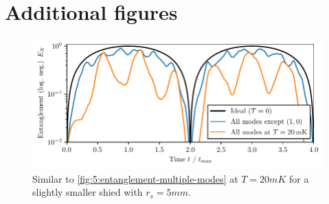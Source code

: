\chapter{Additional figures}\label{apx:additiona-figures}
\begin{figure}[!htbp]
  \centering
  \includegraphics[width=\textwidth]{./../figures/vibrations/entanglement-multiple-modes_rs-5mm.pdf}
  \caption{Similar to \cref{fig:5:entanglement-multiple-modes} at $T=20\si{mK}$ for a slightly smaller shied with $r_s = 5\si{mm}$.}
  \label{fig:apx:entanglement-thermal-shield-rs-5mm}
\end{figure}